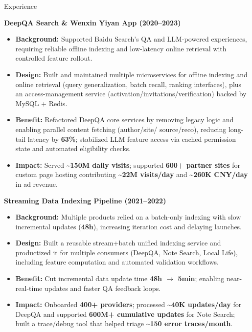 \documentclass[]{resume}
\begin{document}
\begin{rSection}{Experience}
\vspace{0.5ex}
\item \textbf{DeepQA Search \& Wenxin Yiyan App (2020--2023)}
\begin{itemize}
  \item \textbf{Background:} Supported Baidu Search’s QA and LLM-powered experiences, requiring reliable offline indexing and low-latency online retrieval with controlled feature rollout.
  \item \textbf{Design:} Built and maintained multiple microservices for offline indexing and online retrieval (query generalization, batch recall, ranking interfaces), plus an access-management service (activation/invitations/verification) backed by MySQL + Redis.
  \item \textbf{Benefit:} Refactored DeepQA core services by removing legacy logic and enabling parallel content fetching (author/site/ source/reco), reducing long-tail latency by \textbf{63\%}; stabilized LLM feature access via cached permission state and automated eligibility checks.
  \item \textbf{Impact:} Served \textbf{\textasciitilde150M daily visits}; supported \textbf{600+ partner sites} for custom page hosting contributing \textbf{\textasciitilde22M visits/day} and \textbf{\textasciitilde260K CNY/day} in ad revenue.
\end{itemize}

\vspace{0.5ex}
\item \textbf{Streaming Data Indexing Pipeline (2021--2022)}
\begin{itemize}
  \item \textbf{Background:} Multiple products relied on a batch-only indexing with slow incremental updates (\textbf{48h}), increasing iteration cost and delaying launches.
  \item \textbf{Design:} Built a reusable stream+batch unified indexing  service and productized it for multiple consumers (DeepQA, Note Search, Local Life), including feature computation and automated validation workflows.
  \item \textbf{Benefit:} Cut incremental data update time \textbf{48h $\rightarrow$ 5min}; enabling near-real-time updates and faster QA feedback loops.
  \item \textbf{Impact:} Onboarded \textbf{400+ providers}; processed \textbf{\textasciitilde40K updates/day} for DeepQA and supported \textbf{600M+ cumulative updates} for Note Search; built a trace/debug tool that helped triage \textbf{\textasciitilde150 error traces/month}.
\end{itemize}

\end{rSection}
\end{document}
